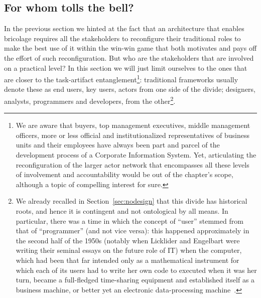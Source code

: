 \documentclass{article}
\begin{document}
\subsection{For whom tolls the bell?}
\label{subsec:role}

In the previous section we hinted at the fact that an architecture that enables bricolage requires all the stakeholders to reconfigure their traditional roles to make the best use of it within the win-win game that both motivates and pays off the effort of such reconfiguration. But who are the stakeholders that are involved on a practical level? In this section we will just limit ourselves to the ones that are closer to the task-artifact entanglement\footnote{We are aware that buyers, top management executives, middle management officers, more or less official and institutionalized representatives of business units and their employees have always been part and parcel of the development process of a Corporate Information System. Yet, articulating the reconfiguration of the larger actor network that encompasses all these levels of involvement and accountability would be out of the chapter's scope, although a topic of compelling interest for sure.}: traditional frameworks usually denote these as end users, key users, actors from one side of the divide; designers, analysts, programmers and developers, from the other\footnote{We already recalled in Section~\ref{sec:nodesign} that this divide has historical roots, and hence it is contingent and not ontological by all means. In particular, there was a time in which the concept of ``user'' stemmed from that of ``programmer'' (and not vice versa): this happened approximately in the second half of the 1950s (notably when Licklider and Engelbart were writing their seminal essays on the future role of IT) when the computer, which had been that far intended only as a mathematical instrument for which each of its users had to write her own code to executed when it was her turn, became a full-fledged time-sharing equipment and established itself as a business machine, or better yet an electronic data-processing machine~\citep{oneill_evolution_1992,campbell-kelly_computer:_2004}.}.
\end{document}
